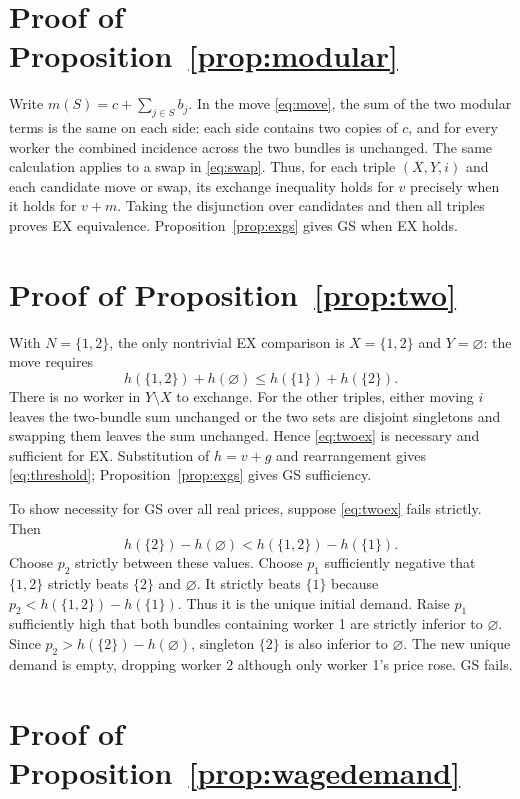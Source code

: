 \documentclass[11pt]{article}
\theoremstyle{definition}
\theoremstyle{remark}
\numberwithin{equation}{section}
\begin{document}
\section{Proof of Proposition~\ref{prop:modular}}\label{app:modular}

Write $m(S)=c+\sum_{j\in S}b_j$. In the move \eqref{eq:move}, the sum of the two modular terms is the same on each side: each side contains two copies of $c$, and for every worker the combined incidence across the two bundles is unchanged. The same calculation applies to a swap in \eqref{eq:swap}. Thus, for each triple $(X,Y,i)$ and each candidate move or swap, its exchange inequality holds for $v$ precisely when it holds for $v+m$. Taking the disjunction over candidates and then all triples proves EX equivalence. Proposition~\ref{prop:exgs} gives GS when EX holds.

\section{Proof of Proposition~\ref{prop:two}}\label{app:two}

With $N=\{1,2\}$, the only nontrivial EX comparison is $X=\{1,2\}$ and $Y=\varnothing$: the move requires
\begin{equation}
h(\{1,2\})+h(\varnothing)\le h(\{1\})+h(\{2\}). \label{eq:twoex}
\end{equation}
There is no worker in $Y\setminus X$ to exchange. For the other triples, either moving $i$ leaves the two-bundle sum unchanged or the two sets are disjoint singletons and swapping them leaves the sum unchanged. Hence \eqref{eq:twoex} is necessary and sufficient for EX. Substitution of $h=v+g$ and rearrangement gives \eqref{eq:threshold}; Proposition~\ref{prop:exgs} gives GS sufficiency.

To show necessity for GS over all real prices, suppose \eqref{eq:twoex} fails strictly. Then
\[
h(\{2\})-h(\varnothing)
<h(\{1,2\})-h(\{1\}).
\]
Choose $p_2$ strictly between these values. Choose $p_1$ sufficiently negative that $\{1,2\}$ strictly beats $\{2\}$ and $\varnothing$. It strictly beats $\{1\}$ because $p_2<h(\{1,2\})-h(\{1\})$. Thus it is the unique initial demand. Raise $p_1$ sufficiently high that both bundles containing worker 1 are strictly inferior to $\varnothing$. Since $p_2>h(\{2\})-h(\varnothing)$, singleton $\{2\}$ is also inferior to $\varnothing$. The new unique demand is empty, dropping worker 2 although only worker 1's price rose. GS fails.

\section{Proof of Proposition~\ref{prop:wagedemand}}\label{app:wagedemand}
\end{document}
